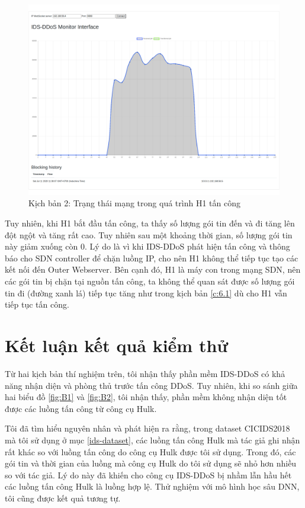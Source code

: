 \begin{figure}[ht!]
	\centering
	\includegraphics[width=\linewidth]{fig/C1.png}
	\caption{Kịch bản 2: Trạng thái mạng trong quá trình H1 tấn công}
	\label{fig:C1}
\end{figure}

Tuy nhiên, khi H1 bắt đầu tấn công, ta thấy số lượng gói tin đến và đi tăng lên đột ngột và tăng rất cao. Tuy nhiên sau một khoảng thời gian, số lượng gói tin này giảm xuống còn 0. Lý do là vì khi IDS-DDoS phát hiện tấn công và thông báo cho SDN controller để chặn luồng IP, cho nên H1 không thể tiếp tục tạo các kết nối đến Outer Webserver. Bên cạnh đó, H1 là máy con trong mạng SDN, nên các gói tin bị chặn tại nguồn tấn công, ta không thể quan sát được số lượng gói tin đi (đường xanh lá) tiếp tục tăng như trong kịch bản \ref{c:6.1} dù cho H1 vẫn tiếp tục tấn công.

\section{Kết luận kết quả kiểm thử}
\label{test-conclusion}

Từ hai kịch bản thí nghiệm trên, tôi nhận thấy phần mềm IDS-DDoS có khả năng nhận diện và phòng thủ trước tấn công DDoS. Tuy nhiên, khi so sánh giữa hai biểu đồ \ref{fig:B1} và \ref{fig:B2}, tôi nhận thấy, phần mềm không nhận diện tốt được các luồng tấn công từ công cụ Hulk.

Tôi đã tìm hiểu nguyên nhân và phát hiện ra rằng, trong dataset CICIDS2018 mà tôi sử dụng ở mục \ref{ids-dataset}, các luồng tấn công Hulk mà tác giả ghi nhận rất khác so với luồng tấn công do công cụ Hulk được tôi sử dụng. Trong đó, các gói tin và thời gian của luồng mà công cụ Hulk do tôi sử dụng sẽ nhỏ hơn nhiều so với tác giả. Lý do này đã khiến cho công cụ IDS-DDoS bị nhầm lẫn hầu hết các luồng tấn công Hulk là luồng hợp lệ. Thử nghiệm với mô hình học sâu DNN, tôi cũng được kết quả tương tự.


